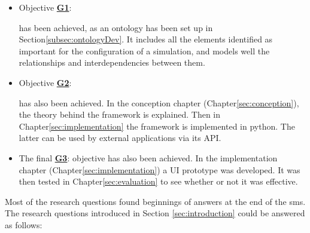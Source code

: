 \begin{itemize}
    \item Objective \hyperref[G1]{\textbf{G1}}:  
    
    has been achieved, as an ontology has been set up in Section\ref{subsec:ontologyDev}. It includes all the elements identified as important for the configuration of a simulation, and models well the relationships and interdependencies between them.
    
    
    \item Objective \hyperref[G2]{\textbf{G2}}:
    
    has also been achieved. In the conception chapter (Chapter\ref{sec:conception}), the theory behind the framework is explained. Then in Chapter\ref{sec:implementation} the framework is implemented in python. The latter can be used by external applications via its API.
    
    
    \item The final \hyperref[G3]{\textbf{G3}}: objective has also been achieved. In the implementation chapter (Chapter\ref{sec:implementation}) a UI prototype was developed. It was then tested in Chapter\ref{sec:evaluation} to see whether or not it was effective.
\end{itemize}
    
\clearpage



Most of the research questions found beginnings of answers at the end of the  \acrfull{sms}. The research questions introduced in Section \ref{sec:introduction} could be answered as follows:\\

